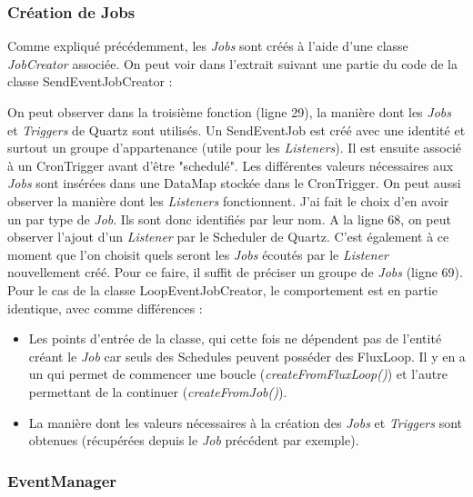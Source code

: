 \documentclass[french]{article}
\begin{document}
\subsubsection{Création de Jobs}

Comme expliqué précédemment, les \textit{Jobs} sont créés à l'aide d'une classe \textit{JobCreator} associée. On peut voir dans l'extrait suivant une partie du code de la classe SendEventJobCreator :



On peut observer dans la troisième fonction (ligne 29), la manière dont les \textit{Jobs} et \textit{Triggers} de Quartz sont utilisés. Un SendEventJob est créé avec une identité et surtout un groupe d'appartenance (utile pour les \textit{Listeners}). Il est ensuite associé à un CronTrigger avant d'être "schedulé". Les différentes valeurs nécessaires aux \textit{Jobs} sont insérées dans une DataMap stockée dans le CronTrigger. \newline
On peut aussi observer la manière dont les \textit{Listeners} fonctionnent. J'ai fait le choix d'en avoir un par type de \textit{Job}. Ils sont donc identifiés par leur nom. \newline
A la ligne 68, on peut observer l'ajout d'un \textit{Listener} par le Scheduler de Quartz. C'est également à ce moment que l'on choisit quels seront les \textit{Jobs} écoutés par le \textit{Listener} nouvellement créé. Pour ce faire, il suffit de préciser un groupe de \textit{Jobs} (ligne 69). \newline
Pour le cas de la classe LoopEventJobCreator, le comportement est en partie identique, avec comme différences :
\begin{itemize}
	\item Les points d'entrée de la classe, qui cette fois ne dépendent pas de l'entité créant le \textit{Job} car seuls des Schedules peuvent posséder des FluxLoop. Il y en a un qui permet de commencer une boucle (\textit{createFromFluxLoop()}) et l'autre permettant de la continuer (\textit{createFromJob()}).
	\item La manière dont les valeurs nécessaires à la création des \textit{Jobs} et \textit{Triggers} sont obtenues (récupérées depuis le \textit{Job} précédent par exemple). 
\end{itemize}  

\subsubsection{EventManager}
\end{document}

